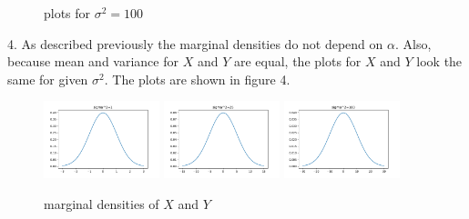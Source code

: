 \documentclass[english]{exercisesheet}
\begin{document}
\begin{solution}
\begin{figure}
 \caption{plots for $\sigma^2=100$}
\end{figure}
\par4. As described previously the marginal densities do not depend on $\alpha$. Also, because mean and variance for $X$ and $Y$ are equal, the plots for $X$ and $Y$ look the same for given $\sigma^2$. The plots are shown in figure 4.
\begin{figure}
 \includegraphics[width=0.3\textwidth]{images/plot-x-1.pdf}
 \includegraphics[width=0.3\textwidth]{images/plot-x-5.pdf}
 \includegraphics[width=0.3\textwidth]{images/plot-x-10.pdf}
 \caption{marginal densities of $X$ and $Y$}
\end{figure}
\end{solution}
\end{document}
